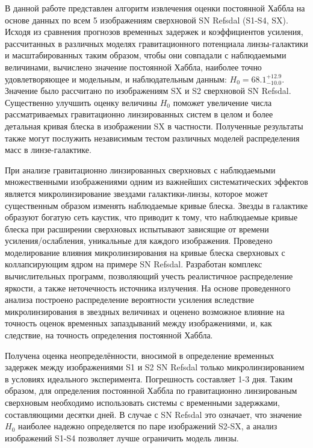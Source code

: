 В данной работе представлен алгоритм извлечения оценки постоянной Хаббла на основе данных по всем 5 изображениям сверхновой SN Refsdal (S1-S4, SX). Исходя из сравнения прогнозов временных задержек и коэффициентов усиления, рассчитанных в различных моделях гравитационного потенциала линзы-галактики и масштабированных таким образом, чтобы они совпадали с наблюдаемыми величинами, вычислено значение постоянной Хаббла, наиболее точно удовлетворяющее и модельным, и наблюдательным данным: $H_0=68.1^{+12.9}_{-10.0}.$  Значение было рассчитано по изображениям SX и S2 сверхновой SN Refsdal. Существенно улучшить оценку величины $H_0$ поможет увеличение числа рассматриваемых гравитационно линзированных систем в целом и более детальная кривая блеска в изображении SX в частности. Полученные результаты также могут послужить независимым тестом различных  моделей распределения масс в линзе-галактике. %

При анализе гравитационно линзированных сверхновых с наблюдаемыми множественными изображениями одним из важнейших систематических эффектов является микролинзирование звездами галактики-линзы, которое может существенным образом изменять наблюдаемые кривые блеска. Звезды в галактике образуют богатую сеть каустик, что приводит к тому, что наблюдаемые кривые блеска при расширении сверхновых испытывают зависящие от времени усиления/ослабления, уникальные для каждого изображения. Проведено моделирование влияния микролинзирования на кривые блеска сверхновых с коллапсирующим ядром на примере SN Refsdal. Разработан комплекс вычислительных программ, позволяющий учесть реалистичное распределение яркости, а также неточечность источника излучения. На основе проведенного анализа построено распределение вероятности усиления вследствие микролинзирования в звездных величинах и оценено возможное влияние на точность оценок временных запаздываний между изображениями, и, как следствие, на точность определения постоянной Хаббла.

Получена оценка неопределённости, вносимой в определение временных задержек между изображениями S1 и S2 SN Refsdal только микролинзированием в условиях идеального эксперимента. Погрешность составляет 1-3 дня. Таким образом, для определения постоянной Хаббла по гравитационно линзированым сверхновым необходимо использовать системы с временными задержками, составляющими десятки дней. В случае с SN Refsdal это означает, что значение $H_0$ наиболее надежно определяется по паре изображений S2-SX, а анализ изображений S1-S4 позволяет лучше ограничить модель линзы. 

